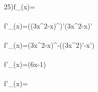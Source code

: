\\25)f_{(x)}=
\\\\f'_{(x)}=((3x^2-x)^{})'\cdot(3x^2-x)'
\\\\f'_{(x)}=(3x^2-x)^{-}\cdot((3x^2)'-x')
\\\\f'_{(x)}=\cdot(6x-1)
\\\\f'_{(x)}=